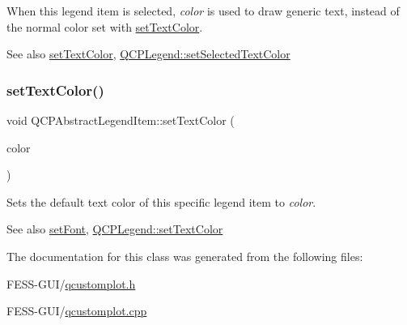 When this legend item is selected, {\itshape color} is used to draw generic text, instead of the normal color set with \hyperlink{class_q_c_p_abstract_legend_item_a6ebace6aaffaedcdab2d74e88acc2d1e}{set\+Text\+Color}.

\begin{DoxySeeAlso}{See also}
\hyperlink{class_q_c_p_abstract_legend_item_a6ebace6aaffaedcdab2d74e88acc2d1e}{set\+Text\+Color}, \hyperlink{class_q_c_p_legend_a7674dfc7a1f30e1abd1018c0ed45e0bc}{Q\+C\+P\+Legend\+::set\+Selected\+Text\+Color} 
\end{DoxySeeAlso}
\hypertarget{class_q_c_p_abstract_legend_item_a6ebace6aaffaedcdab2d74e88acc2d1e}{}\label{class_q_c_p_abstract_legend_item_a6ebace6aaffaedcdab2d74e88acc2d1e} 
\subsubsection{\texorpdfstring{set\+Text\+Color()}{setTextColor()}}
{\footnotesize\ttfamily void Q\+C\+P\+Abstract\+Legend\+Item\+::set\+Text\+Color (\begin{DoxyParamCaption}\item[{const Q\+Color \&}]{color }\end{DoxyParamCaption})}

Sets the default text color of this specific legend item to {\itshape color}.

\begin{DoxySeeAlso}{See also}
\hyperlink{class_q_c_p_abstract_legend_item_a409c53455d8112f71d70c0c43eb10265}{set\+Font}, \hyperlink{class_q_c_p_legend_ae1eb239ff4a4632fe1b6c3e668d845c6}{Q\+C\+P\+Legend\+::set\+Text\+Color} 
\end{DoxySeeAlso}


The documentation for this class was generated from the following files\+:\begin{DoxyCompactItemize}
\item 
F\+E\+S\+S-\/\+G\+U\+I/\hyperlink{qcustomplot_8h}{qcustomplot.\+h}\item 
F\+E\+S\+S-\/\+G\+U\+I/\hyperlink{qcustomplot_8cpp}{qcustomplot.\+cpp}\end{DoxyCompactItemize}
